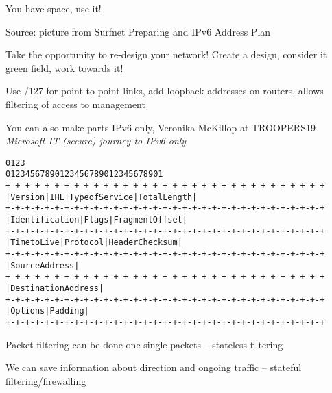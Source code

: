 \documentclass[Screen16to9,17pt]{foils}
\begin{document}
\begin{list2}
\item You have space, use it!
\end{list2}



Source: picture from Surfnet Preparing and IPv6 Address Plan

\begin{list2}
\item Take the opportunity to re-design your network! Create a design, consider it green field, work towards it!
\item Use /127 for point-to-point links, add loopback addresses on routers, allows filtering of access to management
\item You can also make parts IPv6-only, Veronika McKillop at TROOPERS19 \emph{Microsoft IT (secure) journey to IPv6-only}\\
\end{list2}





\begin{alltt}\footnotesize
0                   1                   2                   3
0 1 2 3 4 5 6 7 8 9 0 1 2 3 4 5 6 7 8 9 0 1 2 3 4 5 6 7 8 9 0 1
+-+-+-+-+-+-+-+-+-+-+-+-+-+-+-+-+-+-+-+-+-+-+-+-+-+-+-+-+-+-+-+-+
|Version|  IHL  |Type of Service|          Total Length         |
+-+-+-+-+-+-+-+-+-+-+-+-+-+-+-+-+-+-+-+-+-+-+-+-+-+-+-+-+-+-+-+-+
|         Identification        |Flags|      Fragment Offset    |
+-+-+-+-+-+-+-+-+-+-+-+-+-+-+-+-+-+-+-+-+-+-+-+-+-+-+-+-+-+-+-+-+
|  Time to Live |    Protocol   |         Header Checksum       |
+-+-+-+-+-+-+-+-+-+-+-+-+-+-+-+-+-+-+-+-+-+-+-+-+-+-+-+-+-+-+-+-+
|                       Source Address                          |
+-+-+-+-+-+-+-+-+-+-+-+-+-+-+-+-+-+-+-+-+-+-+-+-+-+-+-+-+-+-+-+-+
|                    Destination Address                        |
+-+-+-+-+-+-+-+-+-+-+-+-+-+-+-+-+-+-+-+-+-+-+-+-+-+-+-+-+-+-+-+-+
|                    Options                    |    Padding    |
+-+-+-+-+-+-+-+-+-+-+-+-+-+-+-+-+-+-+-+-+-+-+-+-+-+-+-+-+-+-+-+-+
\end{alltt}

\begin{list1}
\item Packet filtering can be done one single packets -- stateless filtering
\item We can save information about direction and ongoing traffic -- stateful filtering/firewalling
\end{list1}
\end{document}

